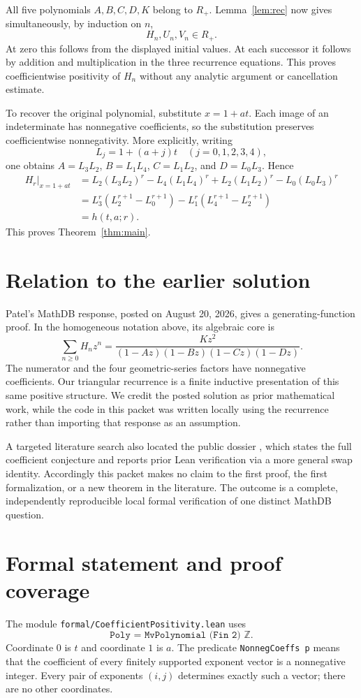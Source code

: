 \documentclass[11pt]{article}
\newcommand{\ZZ}{\mathbb Z}
\begin{document}
All five polynomials $A,B,C,D,K$ belong to $R_+$. Lemma~\ref{lem:rec} now gives simultaneously, by induction on $n$,
\[
H_n,U_n,V_n\in R_+.
\]
At zero this follows from the displayed initial values. At each successor it follows by addition and multiplication in the three recurrence equations. This proves coefficientwise positivity of $H_n$ without any analytic argument or cancellation estimate.

To recover the original polynomial, substitute $x=1+at$. Each image of an indeterminate has nonnegative coefficients, so the substitution preserves coefficientwise nonnegativity. More explicitly, writing
\[
L_j=1+(a+j)t \quad(j=0,1,2,3,4),
\]
one obtains $A=L_3L_2$, $B=L_1L_4$, $C=L_1L_2$, and $D=L_0L_3$. Hence
\begin{align*}
H_r\big|_{x=1+at}
 &=L_2(L_3L_2)^r-L_4(L_1L_4)^r+L_2(L_1L_2)^r-L_0(L_0L_3)^r\\
 &=L_3^r(L_2^{r+1}-L_0^{r+1})-L_1^r(L_4^{r+1}-L_2^{r+1})\\
 &=h(t,a;r).
\end{align*}
This proves Theorem~\ref{thm:main}.

\section{Relation to the earlier solution}
Patel's MathDB response, posted on August 20, 2026, gives a generating-function proof. In the homogeneous notation above, its algebraic core is
\[
\sum_{n\geq0}H_nz^n=\frac{Kz^2}{(1-Az)(1-Bz)(1-Cz)(1-Dz)}.
\]
The numerator and the four geometric-series factors have nonnegative coefficients. Our triangular recurrence is a finite inductive presentation of this same positive structure. We credit the posted solution as prior mathematical work, while the code in this packet was written locally using the recurrence rather than importing that response as an assumption.

A targeted literature search also located the public dossier \cite{Prior}, which states the full coefficient conjecture and reports prior Lean verification via a more general swap identity. Accordingly this packet makes no claim to the first proof, the first formalization, or a new theorem in the literature. The outcome is a complete, independently reproducible local formal verification of one distinct MathDB question.

\section{Formal statement and proof coverage}
The module \texttt{formal/CoefficientPositivity.lean} uses
\[
\texttt{Poly = MvPolynomial (Fin 2) }\ZZ.
\]
Coordinate $0$ is $t$ and coordinate $1$ is $a$. The predicate
\texttt{NonnegCoeffs p} means that the coefficient of every finitely supported exponent vector is a nonnegative integer. Every pair of exponents $(i,j)$ determines exactly such a vector; there are no other coordinates.
\end{document}
